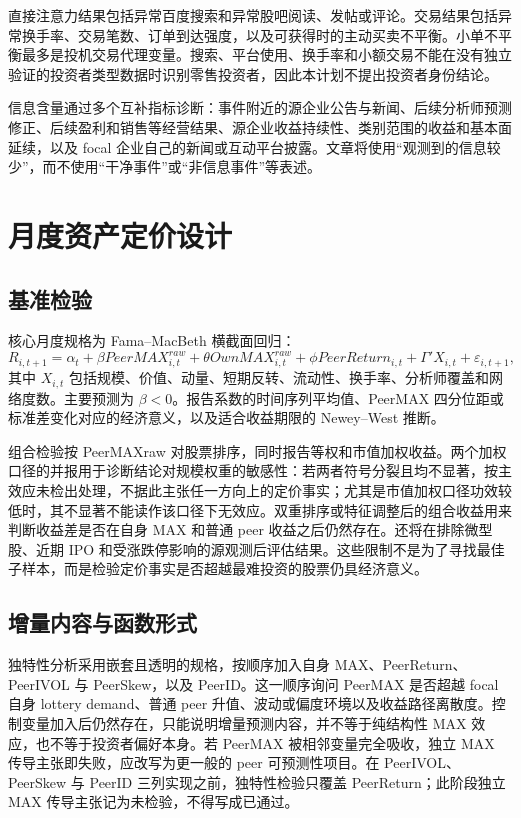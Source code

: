 \documentclass[UTF8,a4paper,11pt]{ctexart}
\begin{document}
直接注意力结果包括异常百度搜索和异常股吧阅读、发帖或评论。交易结果包括异常换手率、交易笔数、订单到达强度，以及可获得时的主动买卖不平衡。小单不平衡最多是投机交易代理变量。搜索、平台使用、换手率和小额交易不能在没有独立验证的投资者类型数据时识别零售投资者，因此本计划不提出投资者身份结论。

信息含量通过多个互补指标诊断：事件附近的源企业公告与新闻、后续分析师预测修正、后续盈利和销售等经营结果、源企业收益持续性、类别范围的收益和基本面延续，以及 focal 企业自己的新闻或互动平台披露。文章将使用“观测到的信息较少”，而不使用“干净事件”或“非信息事件”等表述。

\section{月度资产定价设计}
\subsection{基准检验}
核心月度规格为 Fama--MacBeth 横截面回归：
\begin{equation}
R_{i,t+1}=\alpha_t+\beta PeerMAX^{raw}_{i,t}+\theta OwnMAX^{raw}_{i,t}
+\phi PeerReturn_{i,t}+\Gamma'X_{i,t}+\varepsilon_{i,t+1},
\end{equation}
其中 $X_{i,t}$ 包括规模、价值、动量、短期反转、流动性、换手率、分析师覆盖和网络度数。主要预测为 $\beta<0$。报告系数的时间序列平均值、PeerMAX 四分位距或标准差变化对应的经济意义，以及适合收益期限的 Newey--West 推断。

组合检验按 PeerMAXraw 对股票排序，同时报告等权和市值加权收益。两个加权口径的并报用于诊断结论对规模权重的敏感性：若两者符号分裂且均不显著，按主效应未检出处理，不据此主张任一方向上的定价事实；尤其是市值加权口径功效较低时，其不显著不能读作该口径下无效应。双重排序或特征调整后的组合收益用来判断收益差是否在自身 MAX 和普通 peer 收益之后仍然存在。还将在排除微型股、近期 IPO 和受涨跌停影响的源观测后评估结果。这些限制不是为了寻找最佳子样本，而是检验定价事实是否超越最难投资的股票仍具经济意义。

\subsection{增量内容与函数形式}
独特性分析采用嵌套且透明的规格，按顺序加入自身 MAX、PeerReturn、PeerIVOL 与 PeerSkew，以及 PeerID。这一顺序询问 PeerMAX 是否超越 focal 自身 lottery demand、普通 peer 升值、波动或偏度环境以及收益路径离散度。控制变量加入后仍然存在，只能说明增量预测内容，并不等于纯结构性 MAX 效应，也不等于投资者偏好本身。若 PeerMAX 被相邻变量完全吸收，独立 MAX 传导主张即失败，应改写为更一般的 peer 可预测性项目。在 PeerIVOL、PeerSkew 与 PeerID 三列实现之前，独特性检验只覆盖 PeerReturn；此阶段独立 MAX 传导主张记为未检验，不得写成已通过。
\end{document}
